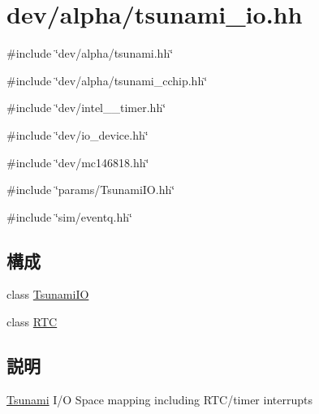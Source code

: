 \hypertarget{tsunami__io_8hh}{
\section{dev/alpha/tsunami\_\-io.hh}
\label{tsunami__io_8hh}
}
{\ttfamily \#include \char`\"{}dev/alpha/tsunami.hh\char`\"{}}\par
{\ttfamily \#include \char`\"{}dev/alpha/tsunami\_\-cchip.hh\char`\"{}}\par
{\ttfamily \#include \char`\"{}dev/intel\_\_\-timer.hh\char`\"{}}\par
{\ttfamily \#include \char`\"{}dev/io\_\-device.hh\char`\"{}}\par
{\ttfamily \#include \char`\"{}dev/mc146818.hh\char`\"{}}\par
{\ttfamily \#include \char`\"{}params/TsunamiIO.hh\char`\"{}}\par
{\ttfamily \#include \char`\"{}sim/eventq.hh\char`\"{}}\par
\subsection*{構成}
\begin{DoxyCompactItemize}
\item 
class \hyperlink{classTsunamiIO}{TsunamiIO}
\item 
class \hyperlink{classTsunamiIO_1_1RTC}{RTC}
\end{DoxyCompactItemize}


\subsection{説明}
\hyperlink{classTsunami}{Tsunami} I/O Space mapping including RTC/timer interrupts 